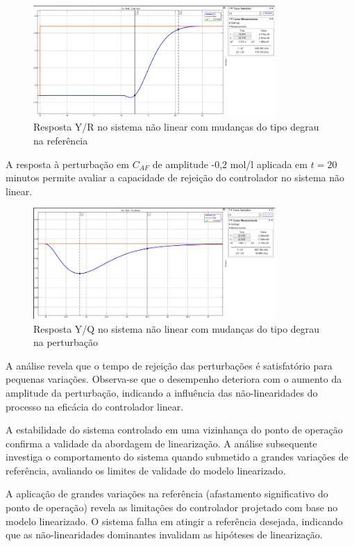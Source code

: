 \documentclass[a4paper,12pt]{article}
\begin{document}
\begin{figure}[H]
  \centering
  \includegraphics[width=0.82\textwidth]{figure6.png}
  \caption{Resposta Y/R no sistema não linear com mudanças do tipo degrau na referência}
  \end{figure}

A resposta à perturbação em $C_{AF}$ de amplitude -0,2 mol/l aplicada em $t = 20$ minutos permite avaliar a capacidade de rejeição do controlador no sistema não linear.

\begin{figure}[H]
  \centering
  \includegraphics[width=0.82\textwidth]{figure7.png}
  \caption{Resposta Y/Q no sistema não linear com mudanças do tipo degrau na perturbação}
  \end{figure}

A análise revela que o tempo de rejeição das perturbações é satisfatório para pequenas variações. Observa-se que o desempenho deteriora com o aumento da amplitude da perturbação, indicando a influência das não-linearidades do processo na eficácia do controlador linear.

A estabilidade do sistema controlado em uma vizinhança do ponto de operação confirma a validade da abordagem de linearização. A análise subsequente investiga o comportamento do sistema quando submetido a grandes variações de referência, avaliando os limites de validade do modelo linearizado.

A aplicação de grandes variações na referência (afastamento significativo do ponto de operação) revela as limitações do controlador projetado com base no modelo linearizado. O sistema falha em atingir a referência desejada, indicando que as não-linearidades dominantes invalidam as hipóteses de linearização.
\end{document}
